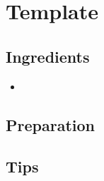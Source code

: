 \thispagestyle{fancy}
\section{Template} \label{template}
\AddToShipoutPicture*{\template}


\subsection*{Ingredients}

\begin{multicols}{3}
	\begin{itemize}
		\item 
	\end{itemize}
\end{multicols}

\subsection*{Preparation}


\subsection*{Tips}
